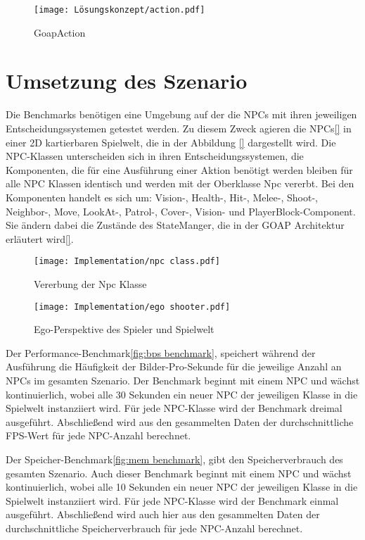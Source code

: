 \begin{figure}[h]
  \centering
  \texttt{[image: Lösungskonzept/action.pdf]}
	\captionsetup{justification=justified, format=plain}
  \caption{GoapAction}
  \label{fig:GoapAction}
\end{figure}








\section{Umsetzung des Szenario}
\label{chap:implementierung szenario}

Die Benchmarks benötigen eine Umgebung auf der die NPCs mit ihren jeweiligen Entscheidungssystemen getestet werden. Zu diesem Zweck agieren die NPCs\ref{} in einer 2D kartierbaren Spielwelt, die in der Abbildung \ref{} dargestellt wird. Die NPC-Klassen unterscheiden sich in ihren Entscheidungssystemen, die Komponenten, die für eine Ausführung einer Aktion benötigt werden bleiben für alle NPC Klassen identisch und werden mit der Oberklasse Npc vererbt. Bei den Komponenten handelt es sich um: Vision-, Health-, Hit-, Melee-, Shoot-, Neighbor-, Move, LookAt-, Patrol-, Cover-, Vision- und PlayerBlock-Component. Sie ändern dabei die Zustände des StateManger, die in der GOAP Architektur erläutert wird\ref{}.

\begin{figure}[h]
  \centering
  \texttt{[image: Implementation/npc class.pdf]}
	\captionsetup{justification=justified, format=plain}
  \caption{Vererbung der Npc Klasse}
  \label{fig:npc class}
\end{figure}

\begin{figure}[h]
  \centering
  \texttt{[image: Implementation/ego shooter.pdf]}
	\captionsetup{justification=justified, format=plain}
  \caption{Ego-Perspektive des Spieler und Spielwelt}
  \label{fig:ego shooter}
\end{figure}

Der Performance-Benchmark\ref{fig:bps benchmark}, speichert während der Ausführung die Häufigkeit der Bilder-Pro-Sekunde für die jeweilige Anzahl an NPCs im gesamten Szenario. Der Benchmark beginnt mit einem NPC und wächst kontinuierlich, wobei alle 30 Sekunden ein neuer NPC der jeweiligen Klasse in die Spielwelt instanziiert wird. Für jede NPC-Klasse wird der Benchmark dreimal ausgeführt. Abschlie\ss{}end wird aus den gesammelten Daten der durchschnittliche FPS-Wert für jede NPC-Anzahl berechnet.

Der Speicher-Benchmark\ref{fig:mem benchmark}, gibt den Speicherverbrauch des gesamten Szenario. Auch dieser Benchmark beginnt mit einem NPC und wächst kontinuierlich, wobei alle 10 Sekunden ein neuer NPC der jeweiligen Klasse in die Spielwelt instanziiert wird. Für jede NPC-Klasse wird der Benchmark einmal ausgeführt. Abschlie\ss{}end wird auch hier aus den gesammelten Daten der durchschnittliche Speicherverbrauch für jede NPC-Anzahl berechnet.

